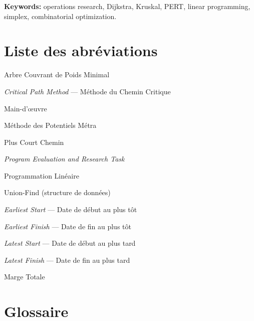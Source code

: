 \documentclass[12pt,a4paper]{article}
\begin{document}
\bigskip
\noindent\textbf{Keywords:} operations research, Dijkstra, Kruskal, PERT, linear
programming, simplex, combinatorial optimization.

\newpage


\thispagestyle{empty}
\tableofcontents
\newpage
\listoffigures
\newpage
\section*{Liste des abréviations}

\begin{description}[leftmargin=3.5cm, labelwidth=3cm, font=\bfseries]
  \item[ACPM]  Arbre Couvrant de Poids Minimal
  \item[CPM]   \textit{Critical Path Method} — Méthode du Chemin Critique
  \item[MO]    Main-d'\oe{}uvre
  \item[MPM]   Méthode des Potentiels Métra
  \item[PCC]   Plus Court Chemin
  \item[PERT]  \textit{Program Evaluation and Research Task}
  \item[PL]    Programmation Linéaire
  \item[UF]    Union-Find (structure de données)
  \item[$ES$]  \textit{Earliest Start} — Date de début au plus tôt
  \item[$EF$]  \textit{Earliest Finish} — Date de fin au plus tôt
  \item[$LS$]  \textit{Latest Start} — Date de début au plus tard
  \item[$LF$]  \textit{Latest Finish} — Date de fin au plus tard
  \item[$MT$]  Marge Totale
\end{description}
\newpage
\section*{Glossaire}
\end{document}
